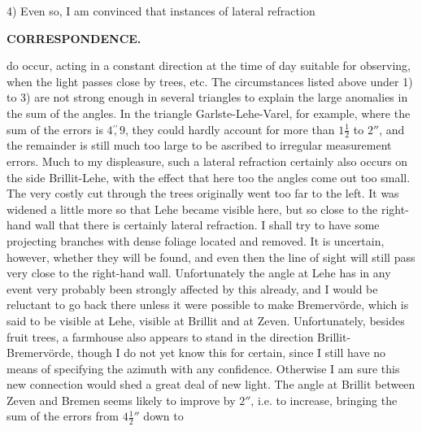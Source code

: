 \par\noindent\hspace*{\parindent}4) Even so, I am convinced that instances of lateral refraction
\par\medskip\noindent\makebox[.86\linewidth][r]{62\textsuperscript{*}}\par

\par\clearpage
\noindent{}\hfill{\small\textbf{CORRESPONDENCE.}}\hfill\null\par\medskip
\noindent do occur, acting in a constant direction at the time of day suitable for observing, when the light passes close by trees, etc. The circumstances listed above under 1) to 3) are not strong enough in several triangles to explain the large anomalies in the sum of the angles. In the triangle Garlste-Lehe-Varel, for example, where the sum of the errors is $4\overset{\prime\prime}{,}9$, they could hardly account for more than $1\frac12$ to $2''$, and the remainder is still much too large to be ascribed to irregular measurement errors. Much to my displeasure, such a lateral refraction certainly also occurs on the side Brillit-Lehe, with the effect that here too the angles come out too small. The very costly cut through the trees originally went too far to the left. It was widened a little more so that Lehe became visible here, but so close to the right-hand wall that there is certainly lateral refraction. I shall try to have some projecting branches with dense foliage located and removed. It is uncertain, however, whether they will be found, and even then the line of sight will still pass very close to the right-hand wall. Unfortunately the angle at Lehe has in any event very probably been strongly affected by this already, and I would be reluctant to go back there unless it were possible to make Bremervörde, which is said to be visible at Lehe, visible at Brillit and at Zeven. Unfortunately, besides fruit trees, a farmhouse also appears to stand in the direction Brillit-Bremervörde, though I do not yet know this for certain, since I still have no means of specifying the azimuth with any confidence. Otherwise I am sure this new connection would shed a great deal of new light. The angle at Brillit between Zeven and Bremen seems likely to improve by $2''$, i.e. to increase, bringing the sum of the errors from $4\frac12{}''$ down to
